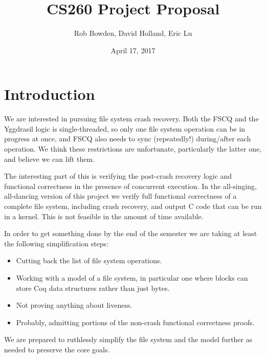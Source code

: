 \documentclass[11pt, twocolumn, letterpaper]{article}
\title{CS260 Project Proposal}
\author{Rob Bowden, David Holland, Eric Lu}
\date{April 17, 2017}
\begin{document}
\maketitle

\begin{abstract}
\end{abstract}

\section{Introduction}

%

We are interested in pursuing file system crash recovery.
Both the FSCQ and the Yggdrasil logic is single-threaded, so only
one file system operation can be in progress at once, and FSCQ also
needs to sync (repeatedly!) during/after each operation.
We think these restrictions are unfortunate, particularly the latter
one, and believe we can lift them.

The interesting part of this is verifying the post-crash recovery
logic and functional correctness in the presence of concurrent
execution.
In the all-singing, all-dancing version of this project we verify full
functional correctness of a complete file system, including crash
recovery, and output C code that can be run in a kernel.
This is not feasible in the amount of time available.

In order to get something done by the end of the semester we are
taking at least the following simplification steps:
\begin{itemize}
\item Cutting back the list of file system operations.
\item Working with a model of a file system, in particular one where
      blocks can store Coq data structures rather than just bytes.
\item Not proving anything about liveness.
\item Probably, admitting portions of the non-crash functional
      correctness proofs.
\end{itemize}
We are prepared to ruthlessly simplify the file system and the model
further as needed to preserve the core goals.

%
\end{document}
